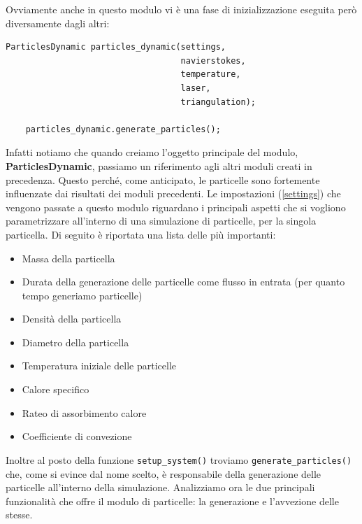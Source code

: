     Ovviamente anche in questo modulo vi è una fase di inizializzazione eseguita però diversamente dagli altri:
    \begin{verbatim}
ParticlesDynamic particles_dynamic(settings,
                                   navierstokes,
                                   temperature,
                                   laser,
                                   triangulation);

    particles_dynamic.generate_particles();
    \end{verbatim}
    Infatti notiamo che quando creiamo l'oggetto principale del modulo, \textbf{ParticlesDynamic}, passiamo un riferimento agli altri moduli creati in precedenza. Questo perché, come anticipato,
    le particelle sono fortemente influenzate dai risultati dei moduli precedenti.
    Le impostazioni (\ref*{settings}) che vengono passate a questo modulo riguardano i principali aspetti che si vogliono parametrizzare all'interno di una simulazione di particelle,
    per la singola particella. Di seguito è riportata una lista delle più importanti:
    \begin{itemize}
        \item Massa della particella
        \item Durata della generazione delle particelle come flusso in entrata (per quanto tempo generiamo particelle)
        \item Densità della particella
        \item Diametro della particella
        \item Temperatura iniziale delle particelle
        \item Calore specifico
        \item Rateo di assorbimento calore
        \item Coefficiente di convezione
    \end{itemize}
    Inoltre al posto della funzione \texttt{setup\_system()} troviamo \texttt{generate\_particles()} che, come si evince
    dal nome scelto, è responsabile della generazione delle particelle all'interno della simulazione.
    Analizziamo ora le due principali funzionalità che offre il modulo di particelle: la generazione e l'avvezione delle stesse.
